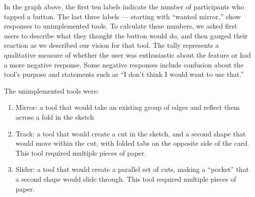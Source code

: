 
In the graph above, the first ten labels indicate the number of
participants who tapped a button. The last three labels --- starting
with ``wanted mirror,'' show responses to unimplemented tools. To
calculate these numbers, we asked first users to describe what they
thought the button would do, and then gauged their reaction as we
described our vision for that tool. The tally represents a qualitative
measure of whether the user was enthusiastic about the feature or had a
more negative response. Some negative responses include confusion about
the tool's purpose and statements such as ``I don't think I would want
to use that.''

The unimplemented tools were:

\begin{enumerate}
\def\labelenumi{\arabic{enumi}.}
\itemsep1pt\parskip0pt
\item
  Mirror: a tool that would take an existing group of edges and reflect
  them across a fold in the sketch
\item
  Track: a tool that would create a cut in the sketch, and a second
  shape that would move within the cut, with folded tabs on the opposite
  side of the card. This tool required multiple pieces of paper.
\item
  Slider: a tool that would create a parallel set of cuts, making a
  ``pocket'' that a second shape would slide through. This tool required
  multiple pieces of paper.
\end{enumerate}

